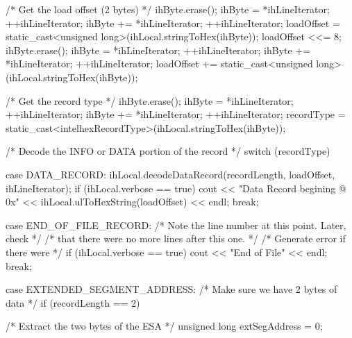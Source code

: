 \begin{DoxyCode}
{{{{                /* Get the load offset (2 bytes)                              */
                ihByte.erase();
                ihByte = *ihLineIterator;
                ++ihLineIterator;
                ihByte += *ihLineIterator;
                ++ihLineIterator;
                loadOffset = 
                        static_cast<unsigned long>(ihLocal.stringToHex(ihByte));
                loadOffset <<= 8;
                ihByte.erase();
                ihByte = *ihLineIterator;
                ++ihLineIterator;
                ihByte += *ihLineIterator;
                ++ihLineIterator;
                loadOffset += 
                        static_cast<unsigned long>(ihLocal.stringToHex(ihByte));
                
                /* Get the record type                                        */
                ihByte.erase();
                ihByte = *ihLineIterator;
                ++ihLineIterator;
                ihByte += *ihLineIterator;
                ++ihLineIterator;
                recordType = 
                   static_cast<intelhexRecordType>(ihLocal.stringToHex(ihByte));
                           
                /* Decode the INFO or DATA portion of the record              */
                switch (recordType)
                {
                    case DATA_RECORD:
                        ihLocal.decodeDataRecord(recordLength, loadOffset,
                                                 ihLineIterator);
                        if (ihLocal.verbose == true)
                        {
                            cout << "Data Record begining @ 0x" << 
                                      ihLocal.ulToHexString(loadOffset) << endl;
                        }
                        break;
                    
                    case END_OF_FILE_RECORD:
                        /* Note the line number at this point. Later, check   */
                        /* that there were no more lines after this one.      */
                        /* Generate error if there were                       */
                        if (ihLocal.verbose == true)
                        {
                            cout << "End of File" << endl;
                        }
                        break;
                        
                    case EXTENDED_SEGMENT_ADDRESS:
                        /* Make sure we have 2 bytes of data                  */
                        if (recordLength == 2)
                        {
                            /* Extract the two bytes of the ESA               */
                            unsigned long extSegAddress = 0;
                            
}}}}}}
\end{DoxyCode}
